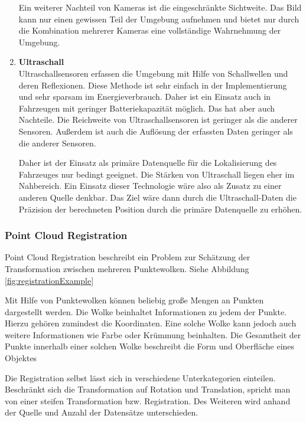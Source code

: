 \begin{enumerate}[leftmargin=*]
    Ein weiterer Nachteil von Kameras ist die eingeschränkte Sichtweite. 
    Das Bild kann nur einen gewissen Teil der Umgebung aufnehmen und bietet nur durch die Kombination mehrerer Kameras eine vollständige Wahrnehmung der Umgebung.

    \item \textbf{Ultraschall} \\
    Ultraschallsensoren erfassen die Umgebung mit Hilfe von Schallwellen und deren Reflexionen. 
    Diese Methode ist sehr einfach in der Implementierung und sehr sparsam im Energieverbrauch. 
    Daher ist ein Einsatz auch in Fahrzeugen mit geringer Batteriekapazität möglich.
    Das hat aber auch Nachteile. 
    Die Reichweite von Ultraschallsensoren ist geringer als die anderer Sensoren. 
    Außerdem ist auch die Auflösung der erfassten Daten geringer als die anderer Sensoren.

    Daher ist der Einsatz als primäre Datenquelle für die Lokalisierung des Fahrzeuges nur bedingt geeignet.
    Die Stärken von Ultraschall liegen eher im Nahbereich.
    Ein Einsatz dieser Technologie wäre also als Zusatz zu einer anderen Quelle denkbar. 
    Das Ziel wäre dann durch die Ultraschall-Daten die Präzision der berechneten Position durch die primäre Datenquelle zu erhöhen. 
\end{enumerate}

\subsubsection{Point Cloud Registration}
\label{pcl}
Point Cloud Registration beschreibt ein Problem zur Schätzung der Transformation zwischen mehreren Punktewolken. Siehe Abbildung \ref{fig:registrationExample}

Mit Hilfe von Punktewolken können beliebig große Mengen an Punkten dargestellt werden.
Die Wolke beinhaltet Informationen zu jedem der Punkte.
Hierzu gehören zumindest die Koordinaten.
Eine solche Wolke kann jedoch auch weitere Informationen wie Farbe oder Krümmung beinhalten. 
Die Gesamtheit der Punkte innerhalb einer solchen Wolke beschreibt die Form und Oberfläche eines Objektes
\cite[ch. 2.2]{registration2021}

Die Registration selbst lässt sich in verschiedene Unterkategorien einteilen.
Beschränkt sich die Transformation auf Rotation und Translation, spricht man von einer steifen Transformation bzw. Registration.
Des Weiteren wird anhand der Quelle und Anzahl der Datensätze unterschieden.

